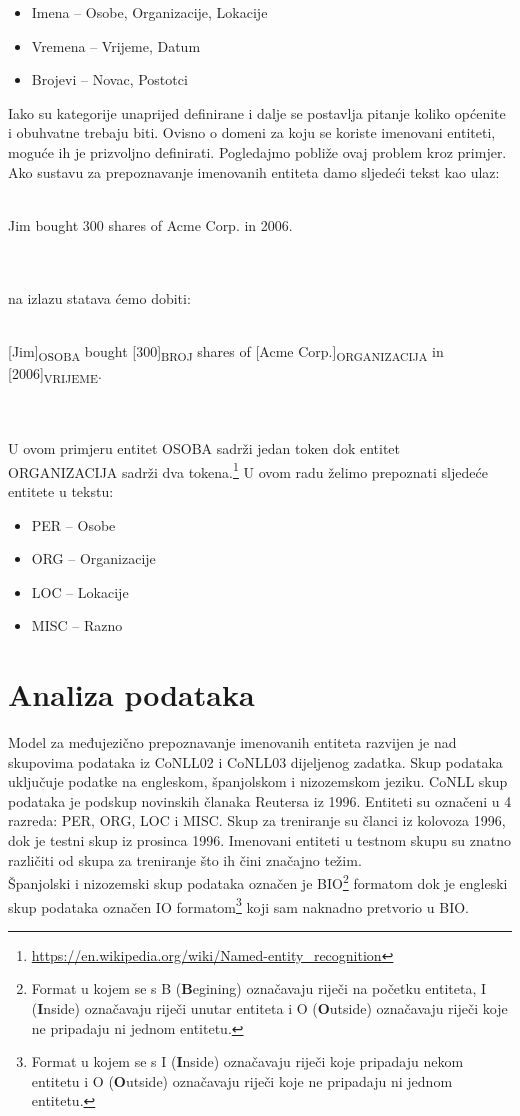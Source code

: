 \documentclass[times, utf8, seminar]{fer}
\begin{document}
\begin{itemize}
	\item Imena -- Osobe, Organizacije, Lokacije
	\item Vremena -- Vrijeme, Datum
	\item Brojevi -- Novac, Postotci
\end{itemize}

Iako su kategorije unaprijed definirane i dalje se postavlja pitanje koliko općenite i obuhvatne trebaju biti. Ovisno o domeni za koju se koriste imenovani entiteti, moguće ih je prizvoljno definirati. Pogledajmo pobliže ovaj problem kroz primjer. Ako sustavu za prepoznavanje imenovanih entiteta damo sljedeći tekst kao ulaz: \\\\
\centerline{Jim  bought 300 shares of Acme Corp. in 2006.}\\\\
na izlazu statava ćemo dobiti:\\\\
\centerline{[Jim]\textsubscript{OSOBA} bought [300]\textsubscript{BROJ} shares of [Acme Corp.]\textsubscript{ORGANIZACIJA} in [2006]\textsubscript{VRIJEME}.}\\\\
U ovom primjeru entitet OSOBA sadrži jedan token dok entitet ORGANIZACIJA sadrži dva tokena.\footnote{\url{https://en.wikipedia.org/wiki/Named-entity_recognition}} U ovom radu želimo prepoznati sljedeće entitete u tekstu:

\begin{itemize}
	\item PER -- Osobe
	\item ORG -- Organizacije
	\item LOC -- Lokacije
	\item MISC -- Razno
\end{itemize}

\chapter{Analiza podataka}
Model za međujezično prepoznavanje imenovanih entiteta razvijen je nad skupovima podataka iz CoNLL02 i CoNLL03 dijeljenog zadatka. Skup podataka uključuje podatke na engleskom, španjolskom i nizozemskom jeziku. CoNLL skup podataka je podskup novinskih članaka Reutersa iz 1996. Entiteti su označeni u 4 razreda: PER, ORG, LOC i MISC. Skup za treniranje su članci iz kolovoza 1996, dok je testni skup iz prosinca 1996. Imenovani entiteti u testnom skupu su znatno različiti od skupa za treniranje što ih čini značajno težim.\citep{Ratinov:2009:DCM:1596374.1596399} \\
\indent Španjolski i nizozemski skup podataka označen je BIO\footnote{Format u kojem se s B (\textbf{B}egining) označavaju riječi na početku entiteta, I (\textbf{I}nside) označavaju riječi unutar entiteta i O (\textbf{O}utside) označavaju riječi koje ne pripadaju ni jednom entitetu.} formatom dok je engleski skup podataka označen IO formatom\footnote{Format u kojem se s I (\textbf{I}nside) označavaju riječi koje pripadaju nekom entitetu i O (\textbf{O}utside) označavaju riječi koje ne pripadaju ni jednom entitetu.} koji sam naknadno pretvorio u BIO.
\end{document}
